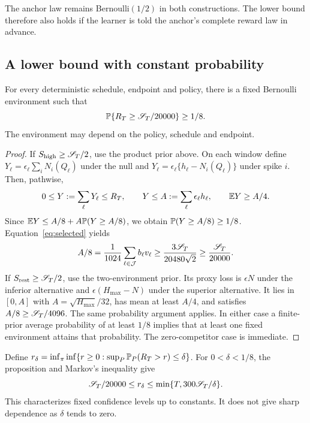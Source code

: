 The anchor law remains Bernoulli$(1/2)$ in both constructions. The lower bound therefore also holds if the learner is told the anchor's complete reward law in advance.

\subsection{A lower bound with constant probability}
\begin{proposition}\label{prop:prob-lower}
For every deterministic schedule, endpoint and policy, there is a fixed Bernoulli environment such that
\[
 \mathbb P\{R_T\ge\mathscr S_T/20000\}\ge1/8.
\]
The environment may depend on the policy, schedule and endpoint.
\end{proposition}
\begin{proof}
If $S_{\mathrm{high}}\ge\mathscr S_T/2$, use the product prior above. On each window define $Y_\ell=\epsilon_\ell\sum_iN_i(Q_\ell)$ under the null and $Y_\ell=\epsilon_\ell\{h_\ell-N_i(Q_\ell)\}$ under spike $i$. Then, pathwise,
\[
 0\le Y:=\sum_\ell Y_\ell\le R_T,\qquad
 Y\le A:=\sum_\ell\epsilon_\ell h_\ell,\qquad \mathbb E Y\ge A/4.
\]
Since $\mathbb E Y\le A/8+A\mathbb P(Y\ge A/8)$, we obtain $\mathbb P(Y\ge A/8)\ge1/8$. Equation~\eqref{eq:selected} yields
\[
 A/8=\frac1{1024}\sum_{\ell\in\mathcal J}b_\ell v_\ell
 \ge\frac{3\mathscr S_T}{20480\sqrt2}\ge\frac{\mathscr S_T}{20000}.
\]
If $S_{\mathrm{rest}}\ge\mathscr S_T/2$, use the two-environment prior. Its proxy loss is $\epsilon N$ under the inferior alternative and $\epsilon(H_{\max}-N)$ under the superior alternative. It lies in $[0,A]$ with $A=\sqrt{H_{\max}}/32$, has mean at least $A/4$, and satisfies $A/8\ge\mathscr S_T/4096$. The same probability argument applies. In either case a finite-prior average probability of at least $1/8$ implies that at least one fixed environment attains that probability. The zero-competitor case is immediate.
\end{proof}

Define $r_\delta=\inf_\pi\inf\{r\ge0:\sup_P\mathbb P_P(R_T>r)\le\delta\}$. For $0<\delta<1/8$, the proposition and Markov's inequality give
\[
 \mathscr S_T/20000\le r_\delta\le\min\{T,300\mathscr S_T/\delta\}.
\]
This characterizes fixed confidence levels up to constants. It does not give sharp dependence as $\delta$ tends to zero.

